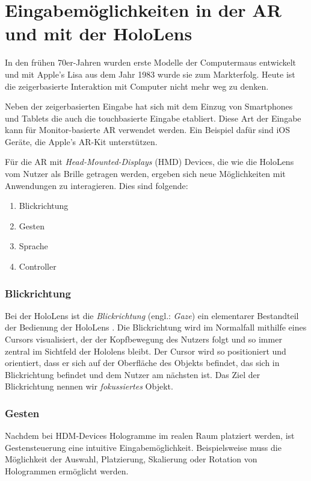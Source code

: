 \section{Eingabemöglichkeiten in der AR und mit der HoloLens}
\label{sec:interaction-hololens}

In den frühen 70er-Jahren wurden erste Modelle der Computermaus entwickelt und mit Apple's Lisa aus dem Jahr 1983 wurde sie zum Markterfolg. Heute ist die zeigerbasierte Interaktion mit Computer nicht mehr weg zu denken.

Neben der zeigerbasierten Eingabe hat sich mit dem Einzug von Smartphones und Tablets die auch die touchbasierte Eingabe etabliert. Diese Art der Eingabe kann für Monitor-basierte AR verwendet werden. Ein Beispiel dafür sind iOS Geräte, die Apple's AR-Kit unterstützen.

Für die AR mit \textit{Head-Mounted-Displays} (HMD) Devices, die wie die HoloLens vom Nutzer als Brille getragen werden, ergeben sich neue Möglichkeiten mit Anwendungen zu interagieren. Dies sind folgende:

\begin{enumerate}
  \item Blickrichtung
  \item Gesten
  \item Sprache
  \item Controller
\end{enumerate}

\subsubsection*{Blickrichtung}
Bei der HoloLens ist die \textit{Blickrichtung} (engl.: \textit{Gaze}) ein elementarer Bestandteil der Bedienung der HoloLens \cite{windows2017interaction}. Die Blickrichtung wird im Normalfall mithilfe eines Cursors visualisiert, der der Kopfbewegung des Nutzers folgt und so immer zentral im Sichtfeld der Hololens bleibt. Der Cursor wird so positioniert und orientiert, dass er sich auf der Oberfläche des Objekts befindet, das sich in Blickrichtung befindet und dem Nutzer am nächsten ist. Das Ziel der Blickrichtung nennen wir \textit{fokussiertes} Objekt.

\subsubsection*{Gesten}
Nachdem bei HDM-Devices Hologramme im realen Raum platziert werden, ist Gestensteuerung eine intuitive Eingabemöglichkeit. Beispielsweise muss die Möglichkeit der Auswahl, Platzierung, Skalierung oder Rotation von Hologrammen ermöglicht werden.

